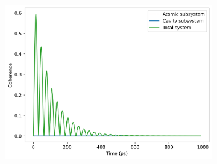 \documentclass[11pt]{article}
\begin{document}
\begin{figure}[H]
    \vspace{0.5cm}
    
    \begin{subfigure}{0.45\textwidth}
        \centering
        \includegraphics[width=\linewidth]{Research Project/Code/results/JCM/OQS_Coh_Both.png}
        \caption{}
        \label{fig:JCM_OQS_Coh_Both}
    \end{subfigure}
    \hfill
    \caption{}
    \label{fig:JCM_OQS_Coh}
\end{figure}
\end{document}
